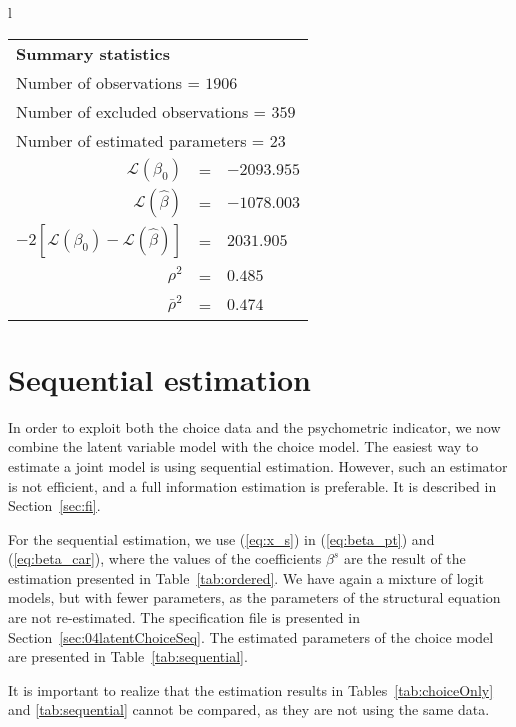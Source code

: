 \documentclass[12pt,a4paper]{article}
\newcommand{\req}[1]{(\ref{#1})}
\begin{document}
\begin{table}[htb]
\begin{tabular}{l}
\begin{tabular}{rcl}
\multicolumn{3}{l}{\bf Summary statistics}\\
\multicolumn{3}{l}{ Number of observations = $1906$} \\
\multicolumn{3}{l}{ Number of excluded observations = $359$} \\
\multicolumn{3}{l}{ Number of estimated  parameters = $23$} \\
 $\mathcal{L}(\beta_0)$ &=&  $-2093.955$ \\
 $\mathcal{L}(\hat{\beta})$ &=& $-1078.003 $  \\
 $-2[\mathcal{L}(\beta_0) -\mathcal{L}(\hat{\beta})]$ &=& $2031.905$ \\
    $\rho^2$ &=&   $0.485$ \\
    $\bar{\rho}^2$ &=&    $0.474$ \\
\end{tabular}
  \end{tabular}
\end{table}


\clearpage 

\section{Sequential estimation}

In order to exploit both the choice data and the psychometric
indicator, we now combine the latent variable model with the choice
model. The easiest way to estimate a joint model is using sequential
estimation. However, such an estimator is not efficient, and a full
information estimation is preferable. It is described in Section~\ref{sec:fi}.

For the sequential estimation, we use \req{eq:x_s} in \req{eq:beta_pt} and
\req{eq:beta_car}, where the values of the coefficients $\beta^s$ are
the result of the estimation  presented in
Table~\ref{tab:ordered}. We have again a mixture of logit models, but
with fewer parameters, as the parameters of the structural equation
are not re-estimated. The specification file is presented in
Section~\ref{sec:04latentChoiceSeq}. The estimated parameters of the
choice model are presented in Table~\ref{tab:sequential}.

It is important to realize that the estimation results in
Tables~\ref{tab:choiceOnly} and \ref{tab:sequential} cannot be
compared, as they are not using the same data. 
\end{document}
